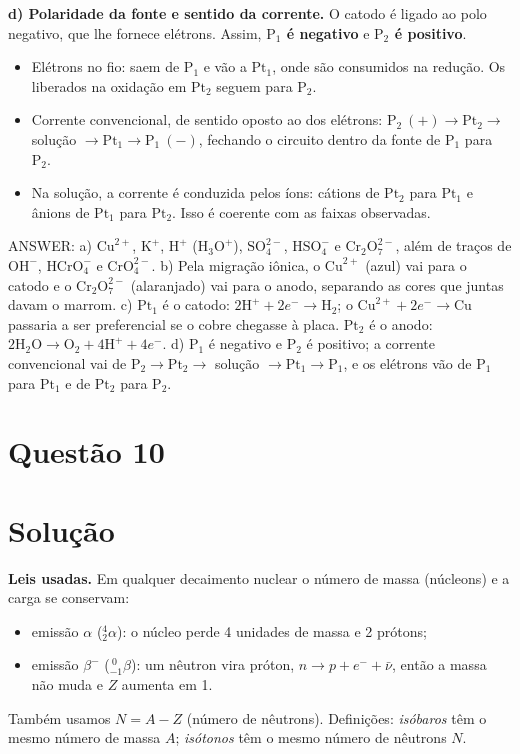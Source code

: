 \documentclass{article}%
\begin{document}
\medskip
\textbf{d) Polaridade da fonte e sentido da corrente.}
O catodo é ligado ao polo negativo, que lhe fornece elétrons. Assim, \textbf{$\text{P}_1$ é negativo} e \textbf{$\text{P}_2$ é positivo}.
\begin{itemize}
\item Elétrons no fio: saem de $\text{P}_1$ e vão a $\text{Pt}_1$, onde são consumidos na redução. Os liberados na oxidação em $\text{Pt}_2$ seguem para $\text{P}_2$.
\item Corrente convencional, de sentido oposto ao dos elétrons: $\text{P}_2\ (+) \rightarrow \text{Pt}_2 \rightarrow$ solução $\rightarrow \text{Pt}_1 \rightarrow \text{P}_1\ (-)$, fechando o circuito dentro da fonte de $\text{P}_1$ para $\text{P}_2$.
\item Na solução, a corrente é conduzida pelos íons: cátions de $\text{Pt}_2$ para $\text{Pt}_1$ e ânions de $\text{Pt}_1$ para $\text{Pt}_2$. Isso é coerente com as faixas observadas.
\end{itemize}

\medskip
ANSWER: a) $\text{Cu}^{2+}$, $\text{K}^{+}$, $\text{H}^{+}$ ($\text{H}_3\text{O}^{+}$), $\text{SO}_4^{2-}$, $\text{HSO}_4^{-}$ e $\text{Cr}_2\text{O}_7^{2-}$, além de traços de $\text{OH}^{-}$, $\text{HCrO}_4^{-}$ e $\text{CrO}_4^{2-}$. b) Pela migração iônica, o $\text{Cu}^{2+}$ (azul) vai para o catodo e o $\text{Cr}_2\text{O}_7^{2-}$ (alaranjado) vai para o anodo, separando as cores que juntas davam o marrom. c) $\text{Pt}_1$ é o catodo: $2\text{H}^{+} + 2e^{-} \rightarrow \text{H}_2$; o $\text{Cu}^{2+} + 2e^{-} \rightarrow \text{Cu}$ passaria a ser preferencial se o cobre chegasse à placa. $\text{Pt}_2$ é o anodo: $2\text{H}_2\text{O} \rightarrow \text{O}_2 + 4\text{H}^{+} + 4e^{-}$. d) $\text{P}_1$ é negativo e $\text{P}_2$ é positivo; a corrente convencional vai de $\text{P}_2 \rightarrow \text{Pt}_2 \rightarrow$ solução $\rightarrow \text{Pt}_1 \rightarrow \text{P}_1$, e os elétrons vão de $\text{P}_1$ para $\text{Pt}_1$ e de $\text{Pt}_2$ para $\text{P}_2$.%
\newpage%
\section*{Questão 10}

\section*{Solução}

\textbf{Leis usadas.} Em qualquer decaimento nuclear o número de massa (núcleons) e a carga se conservam:
\begin{itemize}
\item emissão $\alpha$ (${}^{4}_{2}\alpha$): o núcleo perde 4 unidades de massa e 2 prótons;
\item emissão $\beta^-$ (${}^{\ 0}_{-1}\beta$): um nêutron vira próton, $n \rightarrow p + e^- + \bar{\nu}$, então a massa não muda e $Z$ aumenta em 1.
\end{itemize}
Também usamos $N = A - Z$ (número de nêutrons). Definições: \emph{isóbaros} têm o mesmo número de massa $A$; \emph{isótonos} têm o mesmo número de nêutrons $N$.
\end{document}
